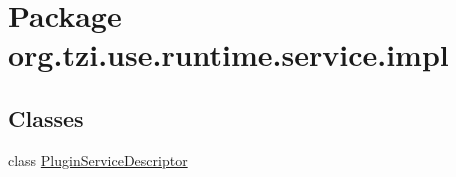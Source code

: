 \hypertarget{namespaceorg_1_1tzi_1_1use_1_1runtime_1_1service_1_1impl}{\section{Package org.\-tzi.\-use.\-runtime.\-service.\-impl}
\label{namespaceorg_1_1tzi_1_1use_1_1runtime_1_1service_1_1impl}
}
\subsection*{Classes}
\begin{DoxyCompactItemize}
\item 
class \hyperlink{classorg_1_1tzi_1_1use_1_1runtime_1_1service_1_1impl_1_1_plugin_service_descriptor}{Plugin\-Service\-Descriptor}
\end{DoxyCompactItemize}
